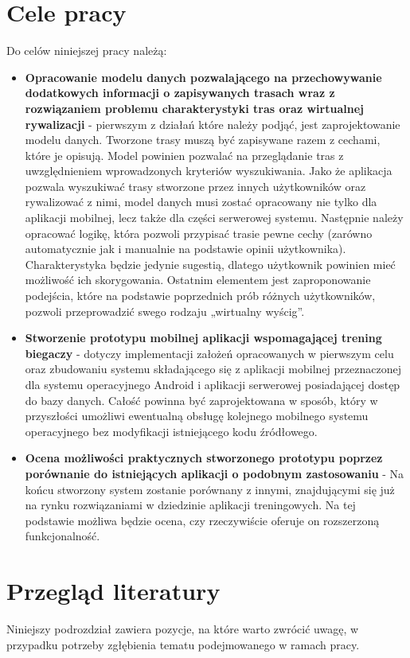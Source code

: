 \section{Cele pracy}\label{chap:cele-pracy}
Do celów niniejszej pracy należą:
\begin{itemize}
\item \textbf{Opracowanie modelu danych pozwalającego na przechowywanie dodatkowych informacji o zapisywanych trasach wraz z rozwiązaniem problemu charakterystyki tras oraz wirtualnej rywalizacji} - pierwszym z działań które należy podjąć, jest zaprojektowanie modelu danych. Tworzone trasy muszą być zapisywane razem z cechami, które je opisują. Model powinien pozwalać na przeglądanie tras z uwzględnieniem wprowadzonych kryteriów wyszukiwania. Jako że aplikacja pozwala wyszukiwać trasy stworzone przez innych użytkowników oraz rywalizować z nimi, model danych musi zostać opracowany nie tylko dla aplikacji mobilnej, lecz także dla części serwerowej systemu. Następnie należy opracować logikę, która pozwoli przypisać trasie pewne cechy (zarówno automatycznie jak i manualnie na podstawie opinii użytkownika). Charakterystyka będzie jedynie sugestią, dlatego użytkownik powinien mieć możliwość ich skorygowania. Ostatnim elementem jest zaproponowanie podejścia, które na podstawie poprzednich prób różnych użytkowników, pozwoli przeprowadzić swego rodzaju „wirtualny wyścig”.
\item \textbf{Stworzenie prototypu mobilnej aplikacji wspomagającej trening biegaczy} - dotyczy implementacji założeń opracowanych w pierwszym celu oraz zbudowaniu systemu składającego się z aplikacji mobilnej przeznaczonej dla systemu operacyjnego Android \cite{android} i aplikacji serwerowej posiadającej dostęp do bazy danych. Całość powinna być zaprojektowana w sposób, który w przyszłości umożliwi ewentualną obsługę kolejnego mobilnego systemu operacyjnego bez modyfikacji istniejącego kodu źródłowego.
\item \textbf{Ocena możliwości praktycznych stworzonego prototypu poprzez porównanie do istniejących aplikacji o podobnym zastosowaniu} - Na końcu stworzony system zostanie porównany z innymi, znajdującymi się już na rynku rozwiązaniami w dziedzinie aplikacji treningowych. Na tej podstawie możliwa będzie ocena, czy rzeczywiście oferuje on rozszerzoną funkcjonalność.
\end{itemize}

\section{Przegląd literatury}
Niniejszy podrozdział zawiera pozycje, na które warto zwrócić uwagę, w przypadku potrzeby zgłębienia tematu podejmowanego w ramach pracy.
